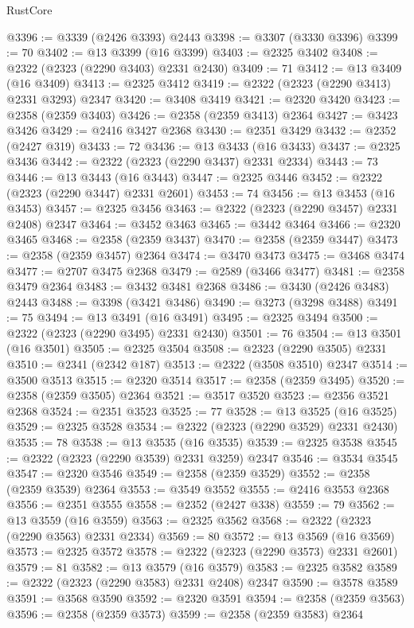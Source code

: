 \begin{lexlean}{RustCore}
\begin{coremodule}
@3396 := @3339 (@2426 @3393) @2443
@3398 := @3307 (@3330 @3396)
@3399 := 70
@3402 := @13 @3399 (@16 @3399)
@3403 := @2325 @3402
@3408 := @2322 (@2323 (@2290 @3403) @2331 @2430)
@3409 := 71
@3412 := @13 @3409 (@16 @3409)
@3413 := @2325 @3412
@3419 := @2322 (@2323 (@2290 @3413) @2331 @3293) @2347
@3420 := @3408 @3419
@3421 := @2320 @3420
@3423 := @2358 (@2359 @3403)
@3426 := @2358 (@2359 @3413) @2364
@3427 := @3423 @3426
@3429 := @2416 @3427 @2368
@3430 := @2351 @3429
@3432 := @2352 (@2427 @319)
@3433 := 72
@3436 := @13 @3433 (@16 @3433)
@3437 := @2325 @3436
@3442 := @2322 (@2323 (@2290 @3437) @2331 @2334)
@3443 := 73
@3446 := @13 @3443 (@16 @3443)
@3447 := @2325 @3446
@3452 := @2322 (@2323 (@2290 @3447) @2331 @2601)
@3453 := 74
@3456 := @13 @3453 (@16 @3453)
@3457 := @2325 @3456
@3463 := @2322 (@2323 (@2290 @3457) @2331 @2408) @2347
@3464 := @3452 @3463
@3465 := @3442 @3464
@3466 := @2320 @3465
@3468 := @2358 (@2359 @3437)
@3470 := @2358 (@2359 @3447)
@3473 := @2358 (@2359 @3457) @2364
@3474 := @3470 @3473
@3475 := @3468 @3474
@3477 := @2707 @3475 @2368
@3479 := @2589 (@3466 @3477)
@3481 := @2358 @3479 @2364
@3483 := @3432 @3481 @2368
@3486 := @3430 (@2426 @3483) @2443
@3488 := @3398 (@3421 @3486)
@3490 := @3273 (@3298 @3488)
@3491 := 75
@3494 := @13 @3491 (@16 @3491)
@3495 := @2325 @3494
@3500 := @2322 (@2323 (@2290 @3495) @2331 @2430)
@3501 := 76
@3504 := @13 @3501 (@16 @3501)
@3505 := @2325 @3504
@3508 := @2323 (@2290 @3505) @2331
@3510 := @2341 (@2342 @187)
@3513 := @2322 (@3508 @3510) @2347
@3514 := @3500 @3513
@3515 := @2320 @3514
@3517 := @2358 (@2359 @3495)
@3520 := @2358 (@2359 @3505) @2364
@3521 := @3517 @3520
@3523 := @2356 @3521 @2368
@3524 := @2351 @3523
@3525 := 77
@3528 := @13 @3525 (@16 @3525)
@3529 := @2325 @3528
@3534 := @2322 (@2323 (@2290 @3529) @2331 @2430)
@3535 := 78
@3538 := @13 @3535 (@16 @3535)
@3539 := @2325 @3538
@3545 := @2322 (@2323 (@2290 @3539) @2331 @3259) @2347
@3546 := @3534 @3545
@3547 := @2320 @3546
@3549 := @2358 (@2359 @3529)
@3552 := @2358 (@2359 @3539) @2364
@3553 := @3549 @3552
@3555 := @2416 @3553 @2368
@3556 := @2351 @3555
@3558 := @2352 (@2427 @338)
@3559 := 79
@3562 := @13 @3559 (@16 @3559)
@3563 := @2325 @3562
@3568 := @2322 (@2323 (@2290 @3563) @2331 @2334)
@3569 := 80
@3572 := @13 @3569 (@16 @3569)
@3573 := @2325 @3572
@3578 := @2322 (@2323 (@2290 @3573) @2331 @2601)
@3579 := 81
@3582 := @13 @3579 (@16 @3579)
@3583 := @2325 @3582
@3589 := @2322 (@2323 (@2290 @3583) @2331 @2408) @2347
@3590 := @3578 @3589
@3591 := @3568 @3590
@3592 := @2320 @3591
@3594 := @2358 (@2359 @3563)
@3596 := @2358 (@2359 @3573)
@3599 := @2358 (@2359 @3583) @2364

\end{coremodule}
\end{lexlean}
